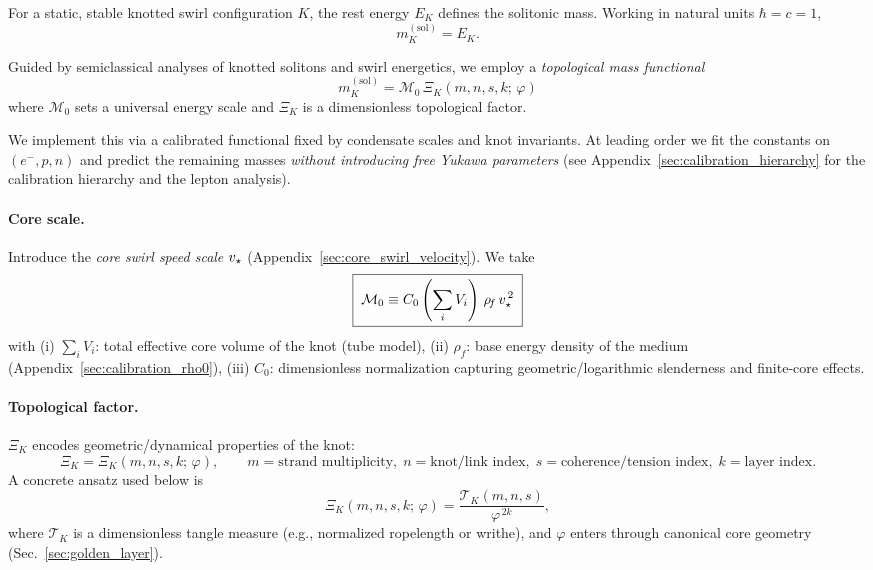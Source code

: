 \documentclass[11pt, preprint,titlepage]{revtex4-2}
\newcommand{\rhoF}{\rho_{\!f}}      %
\begin{document}
	For a static, stable knotted swirl configuration \(K\), the rest energy \(E_K\) defines the solitonic mass.
	Working in natural units \(\hbar=c=1\),
	\begin{equation}
		m_K^{(\mathrm{sol})} = E_K .
	\end{equation}

	Guided by semiclassical analyses of knotted solitons \cite{Faddeev1997} and swirl energetics, we employ a \emph{topological mass functional}
	\begin{equation}
		\boxed{ \; m_K^{(\mathrm{sol})} = \mathcal{M}_0 \,\Xi_K(m,n,s,k;\,\varphi) \; }
		\label{eq:mass-functional}
	\end{equation}
	where \(\mathcal{M}_0\) sets a universal energy scale and \(\Xi_K\) is a dimensionless topological factor.

	We implement this via a calibrated functional fixed by condensate scales and knot invariants. At leading order we fit the constants on \((e^{-},p,n)\) and predict the remaining masses \emph{without introducing free Yukawa parameters} (see Appendix~\ref{sec:calibration_hierarchy} for the calibration hierarchy and the lepton analysis).

	\paragraph{Core scale.}
	Introduce the \emph{core swirl speed scale} \(v_\star\) (Appendix~\ref{sec:core_swirl_velocity}). We take
	\begin{equation}
		\boxed{ \; \mathcal{M}_0 \equiv C_0 \left(\sum_i V_i\right)\,\rhoF\,\vstar^{\,2} \; }
		\label{eq:M0}
	\end{equation}
	with
	(i) \( \sum_i V_i \): total effective core volume of the knot (tube model),
	(ii) \( \rhoF \): base energy density of the medium (Appendix~\ref{sec:calibration_rho0}),
	(iii) \(C_0\): dimensionless normalization capturing geometric/logarithmic slenderness and finite-core effects.

	\paragraph{Topological factor.}
	\(\Xi_K\) encodes geometric/dynamical properties of the knot:
	\[
		\Xi_K = \Xi_K(m,n,s,k;\,\varphi), \qquad
		m=\text{strand multiplicity},\; n=\text{knot/link index},\;
		s=\text{coherence/tension index},\;
		k=\text{layer index}.
	\]
	A concrete ansatz used below is
	\begin{equation}
		\Xi_K(m,n,s,k;\,\varphi) = \frac{\mathcal{T}_K(m,n,s)}{\varphi^{\,2k}},
		\label{eq:Xi-ansatz}
	\end{equation}
	where \(\mathcal{T}_K\) is a dimensionless tangle measure (e.g., normalized ropelength or writhe), and \(\varphi\) enters through canonical core geometry (Sec.~\ref{sec:golden_layer}).
\end{document}
